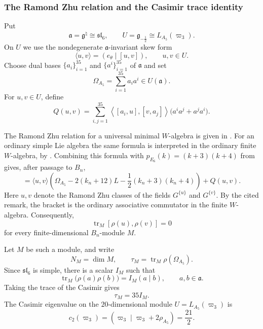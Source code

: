 \documentclass[11pt,reqno]{amsart}
\theoremstyle{definition}
\theoremstyle{remark}
\begin{document}
\subsubsection{The Ramond Zhu relation and the Casimir trace identity}


Put
\[
  \mathfrak a=\mathfrak g^\natural\cong\mathfrak{sl}_6,
  \qquad
  U=\mathfrak g_{-\frac12}\cong L_{A_5}(\varpi_3).
\]
On $U$ we use the nondegenerate $\mathfrak a$-invariant skew form
\begin{equation}\label{e6:eq:symplectic-form-minus-half}
  \langle u,v\rangle=(e_\theta\mid[u,v]),
  \qquad u,v\in U.
\end{equation}
Choose dual bases $\{a_i\}_{i=1}^{35}$ and $\{a^i\}_{i=1}^{35}$ of
$\mathfrak a$ and set
\begin{equation*}
  \Omega_{A_5}=\sum_{i=1}^{35}a_i a^i\in U(\mathfrak a).
\end{equation*}
For $u,v\in U$, define
\begin{equation}\label{e6:eq:def-Q-uv}
  Q(u,v)
  =\sum_{i,j=1}^{35}
    \left\langle[a_i,u],[v,a_j]\right\rangle
    \bigl(a^i a^j+a^j a^i\bigr).
\end{equation}

The Ramond Zhu relation for a universal minimal $W$-algebra is given in
\cite[Equation~(5.1)]{KacMosenederFrajriaPapi2025}.  For an ordinary simple Lie
algebra the same formula is interpreted in the ordinary finite $W$-algebra, by
\cite[Remark~5.8]{KacMosenederFrajriaPapi2025}.  Combining this formula with
$p_{E_6}(k)=(k+3)(k+4)$ from
\cite[Table~4]{AdamovicKacMosenederFrajriaPapiPerse2018} gives, after passage to $B_n$,
\begin{equation*}
  [u,v]
  =\langle u,v\rangle
   \left(
     \Omega_{A_5}
     -2(k_n+12)L
     -\frac12(k_n+3)(k_n+4)
   \right)
   +Q(u,v).
\end{equation*}
Here $u,v$ denote the Ramond Zhu classes of the fields $G^{\{u\}}$ and
$G^{\{v\}}$.  By the cited remark, the bracket is the ordinary associative
commutator in the finite $W$-algebra.  Consequently,
\begin{equation*}
  \operatorname{tr}_M[\rho(u),\rho(v)]=0
\end{equation*}
for every finite-dimensional $B_n$-module $M$.

Let $M$ be such a module, and write
\begin{equation*}
  N_M=\dim M,
  \qquad
  \tau_M=\operatorname{tr}_M\rho(\Omega_{A_5}).
\end{equation*}
Since $\mathfrak{sl}_6$ is simple, there is a scalar $I_M$ such that
\begin{equation}\label{e6:eq:trace-form-index}
  \operatorname{tr}_M\bigl(\rho(a)\rho(b)\bigr)
  =I_M(a\mid b),
  \qquad a,b\in\mathfrak a.
\end{equation}
Taking the trace of the Casimir gives
\begin{equation*}
  \tau_M=35I_M.
\end{equation*}
The Casimir eigenvalue on the $20$-dimensional module
$U=L_{A_5}(\varpi_3)$ is
\begin{equation}\label{e6:eq:Casimir-omega3-A5}
  c_2(\varpi_3)
  =(\varpi_3\mid\varpi_3+2\rho_{A_5})
  =\frac{21}{2}.
\end{equation}
\end{document}
